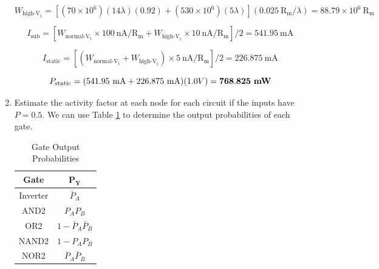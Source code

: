 \documentclass[fleqn]{article}
\begin{document}
\begin{enumerate}
		\begin{equation*}
			W_{\text{high-V}_\text{t}} = \left[(70 \times 10^6)(14\lambda)(0.92) + (530 \times 10^6)(5\lambda)\right](0.025\ \text{R}_\text{m}/\lambda) = 88.79 \times 10^6\ \text{R}_\text{m}
		\end{equation*}
		
		\begin{equation*}
			I_\text{sub} = \left[W_{\text{normal-V}_\text{t}} \times 100\ \text{nA}/\text{R}_\text{m} + W_{\text{high-V}_\text{t}} \times 10\ \text{nA}/\text{R}_\text{m}\right]/2 = 541.95\ \text{mA}
		\end{equation*}			
			
		\begin{equation*}
			I_\text{static} = \left[(W_{\text{normal-V}_\text{t}} + W_{\text{high-V}_\text{t}}) \times 5\ \text{nA}/\text{R}_\text{m}\right]/2 = 226.875\ \text{mA}
		\end{equation*}	
		
		\begin{equation*}
			P_\text{static} = (541.95\ \text{mA} + 226.875\ \text{mA})(1.0 V) = \mathbf{768.825}\ \text{\textbf{mW}}
		\end{equation*}	
		
		\item Estimate the activity factor at each node for each circuit if the inputs have $P = 0.5$. We can use Table \ref{table::gate_out_prob} to determine the output probabilities of each gate.
		
		\vspace{-24pt}	
		\begin{table}[H]
		\begin{center}
		\caption{Gate Output Probabilities}
		\label{table::gate_out_prob}
		{
		\renewcommand{\arraystretch}{1.2}	
		\begin{tabular}{| c | c |}
			\hline
			\textbf{Gate} & $\mathbf{P_Y}$\\
			\hline	
			Inverter & $\bar{P}_A$\\
			\hline	
			AND2 & $P_AP_B$\\
			\hline	
			OR2 & $1 - \bar{P}_A\bar{P}_B$\\
			\hline	
			NAND2 & $1 - P_AP_B$\\
			\hline	
			NOR2 & $\bar{P}_A\bar{P}_B$\\
			\hline
		\end{tabular}
		}
		\end{center}
		\end{table}
		\vspace{-24pt}	
		

\end{enumerate}
\end{document}
